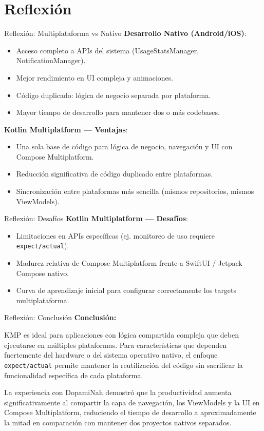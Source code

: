 \documentclass[aspectratio=169]{beamer}
\begin{document}
\section{Reflexión}
\begin{frame}{Reflexión: Multiplataforma vs Nativo}
  \textbf{Desarrollo Nativo (Android/iOS)}:
  \begin{itemize}
    \item Acceso completo a APIs del sistema (UsageStatsManager, NotificationManager).
    \item Mejor rendimiento en UI compleja y animaciones.
    \item Código duplicado: lógica de negocio separada por plataforma.
    \item Mayor tiempo de desarrollo para mantener dos o más codebases.
  \end{itemize}

  \vspace{0.2cm}
  \textbf{Kotlin Multiplatform --- Ventajas}:
  \begin{itemize}
    \item Una sola base de código para lógica de negocio, navegación y UI con Compose Multiplatform.
    \item Reducción significativa de código duplicado entre plataformas.
    \item Sincronización entre plataformas más sencilla (mismos repositorios, mismos ViewModels).
  \end{itemize}
\end{frame}

\begin{frame}{Reflexión: Desafíos}
  \textbf{Kotlin Multiplatform --- Desafíos}:
  \begin{itemize}
    \item Limitaciones en APIs específicas (ej. monitoreo de uso requiere \texttt{expect/actual}).
    \item Madurez relativa de Compose Multiplatform frente a SwiftUI / Jetpack Compose nativo.
    \item Curva de aprendizaje inicial para configurar correctamente los targets multiplataforma.
  \end{itemize}
\end{frame}

\begin{frame}{Reflexión: Conclusión}
  \textbf{Conclusión:}

  \medskip
  KMP es ideal para aplicaciones con lógica compartida compleja que deben ejecutarse en
  múltiples plataformas. Para características que dependen fuertemente del hardware o del
  sistema operativo nativo, el enfoque \texttt{expect/actual} permite mantener la
  reutilización del código sin sacrificar la funcionalidad específica de cada plataforma.

  \medskip
  La experiencia con DopamiNah demostró que la productividad aumenta significativamente al
  compartir la capa de navegación, los ViewModels y la UI en Compose Multiplatform,
  reduciendo el tiempo de desarrollo a aproximadamente la mitad en comparación con
  mantener dos proyectos nativos separados.
\end{frame}
\end{document}
